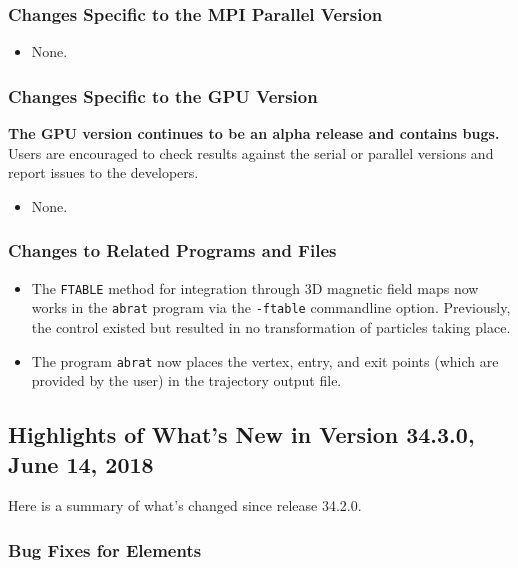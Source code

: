 \documentclass[11pt]{article}
\begin{document}
\subsubsection{Changes Specific to the MPI Parallel Version}

\begin{itemize}
\item None.
\end{itemize}

\subsubsection{Changes Specific to the GPU Version}

{\bf The GPU version continues to be an alpha release and contains bugs.}
Users are encouraged to check results against the serial or parallel versions and report issues to the developers.

\begin{itemize}
\item None.
\end{itemize}

\subsubsection{Changes to Related Programs and Files}

\begin{itemize}
\item The \verb|FTABLE| method for integration through 3D magnetic field maps now works in the \verb|abrat|
  program via the \verb|-ftable| commandline option. Previously, the control existed but resulted in no transformation
  of particles taking place.
\item The program \verb|abrat| now places the vertex, entry, and exit points (which are provided by the user)
  in the trajectory output file.
\end{itemize}


\subsection{Highlights of What's New in Version 34.3.0, June 14, 2018}

Here is a summary of what's changed since release 34.2.0.

\subsubsection{Bug Fixes for Elements}
\end{document}
